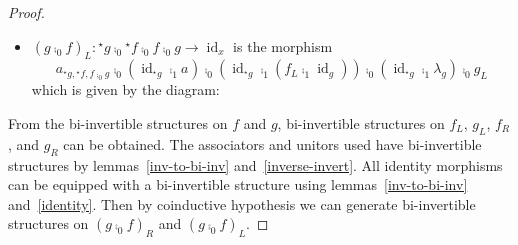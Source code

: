 \documentclass{article}
\DeclareMathOperator{\id}{id}
\newcommand{\linv}[1]{{}^\star\!#1} \newcommand{\rinv}[1]{#1^\star}
\begin{document}
\begin{proof}
\begin{itemize}
\begin{center}
      \end{center}
    \item \({(g \comp_0 f)}_L : \linv g \comp_0 \linv f \comp_0 f
      \comp_0 g \to \id_x\) is the morphism
      \begin{equation*}
        a_{\linv g, \linv f, f \comp_0 g} \comp_0 (\id_{\linv g} \comp_1 a_{})\comp_0 (\id_{\linv g} \comp_1 (f_L \comp_1 \id_g)) \comp_0 (\id_{\linv g} \comp_1 \lambda_g) \comp_0 g_L
      \end{equation*}
      which is given by the diagram:
      \begin{center}
      \end{center}
    \end{itemize}

    From the bi-invertible structures on \(f\) and \(g\),
    bi-invertible structures on \(f_L\), \(g_L\), \(f_R\), and \(g_R\)
    can be obtained. The associators and unitors used have
    bi-invertible structures by lemmas~\ref{inv-to-bi-inv}
    and~\ref{inverse-invert}. All identity morphisms can be equipped
    with a bi-invertible structure using lemmas~\ref{inv-to-bi-inv}
    and~\ref{identity}. Then by coinductive hypothesis we can generate
    bi-invertible structures on \({(g \comp_0 f)}_R\) and \({(g
      \comp_0 f)}_L\).


\end{proof}
\end{document}
